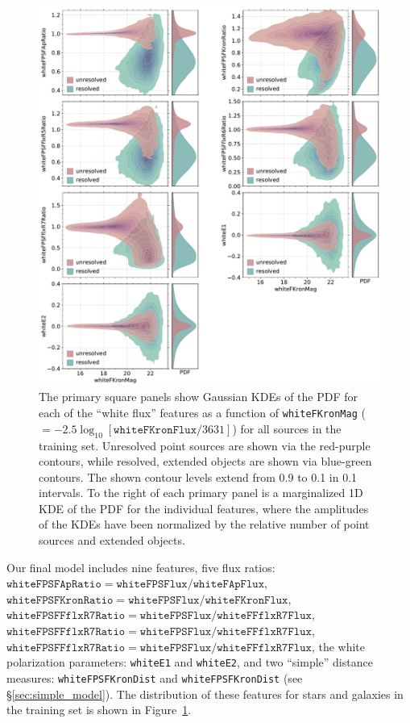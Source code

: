 \documentclass[twocolumn]{aastex63}
\begin{document}
\begin{figure}
    \centering
    \includegraphics[width=6.5in]{./figures/whiteFeatures.pdf}
    \caption{The primary square panels show Gaussian KDEs of the PDF for each
    of the ``white flux'' features as a function of \texttt{whiteFKronMag}
    ($=-2.5\log_{10}[\mathtt{whiteFKronFlux}/3631]$) for all sources in the
    training set. Unresolved point sources are shown via the red-purple
    contours, while resolved, extended objects are shown via blue-green
    contours. The shown contour levels extend from 0.9 to 0.1 in 0.1
    intervals. To the right of each primary panel is a marginalized 1D KDE of
    the PDF for the individual features, where the amplitudes of the KDEs have
    been normalized by the relative number of point sources and extended
    objects.}
    \label{fig:features}
\end{figure} 

Our final model includes nine features, five flux ratios:\\
$\mathtt{whiteFPSFApRatio} = \mathtt{whiteFPSFlux/whiteFApFlux}$,
$\mathtt{whiteFPSFKronRatio} = \mathtt{whiteFPSFlux/whiteFKronFlux}$,
$\mathtt{whiteFPSFFflxR7Ratio} = \mathtt{whiteFPSFlux/whiteFFflxR7Flux}$,
$\mathtt{whiteFPSFFflxR7Ratio} = \mathtt{whiteFPSFlux/whiteFFflxR7Flux}$,
$\mathtt{whiteFPSFFflxR7Ratio} = \mathtt{whiteFPSFlux/whiteFFflxR7Flux}$, the
white polarization parameters: \texttt{whiteE1} and \texttt{whiteE2}, and two
``simple'' distance measures: \texttt{whiteFPSFKronDist} and
\texttt{whiteFPSFKronDist} (see \S\ref{sec:simple_model}). The distribution of
these features for stars and galaxies in the training set is shown in
Figure~\ref{fig:features}.
\end{document}
